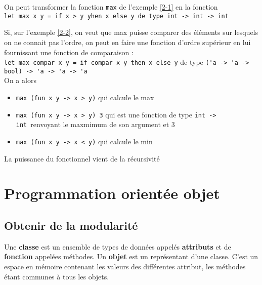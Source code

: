 \begin{example}
	On peut transformer la fonction \lstinline|max| de l'exemple \ref{2-1} en la fonction \\ \lstinline|let max x y = if x > y yhen x else y de type int -> int -> int| \label{2-2}
\end{example}

\begin{example}
	Si, sur l'exemple \ref{2-2}, on veut que max puisse comparer des éléments sur lesquels on ne connait pas l'ordre, on peut en faire une fonction d'ordre supérieur en lui fournissant une fonction de comparaison : \\
	\lstinline|let max compar x y = if compar x y then x else y| de type \lstinline|('a -> 'a -> bool) -> 'a -> 'a -> 'a|\\
	On a alors \begin{itemize}[label =]
		\item \lstinline|max (fun x y -> x > y)| qui calcule le max 
		\item \lstinline|max (fun x y -> x > y) 3| qui est une fonction de type \lstinline|int -> int| renvoyant le maxmimum de son argument et 3
		\item \lstinline|max (fun x y -> x < y)| qui calcule le min
	\end{itemize}
\end{example}

\begin{rem}
	La puissance du fonctionnel vient de la récursivité
\end{rem}

\section{Programmation orientée objet}

\subsection{Obtenir de la modularité}

\begin{definition}
	Une \textbf{classe} est un ensemble de types de données appelés \textbf{attributs} et de \textbf{fonction} appelées méthodes. \newline
	Un \textbf{objet} est un représentant d'une classe. C'est un espace en mémoire contenant les valeurs des différentes attribut, les méthodes étant communes à tous les objets.
\end{definition}

